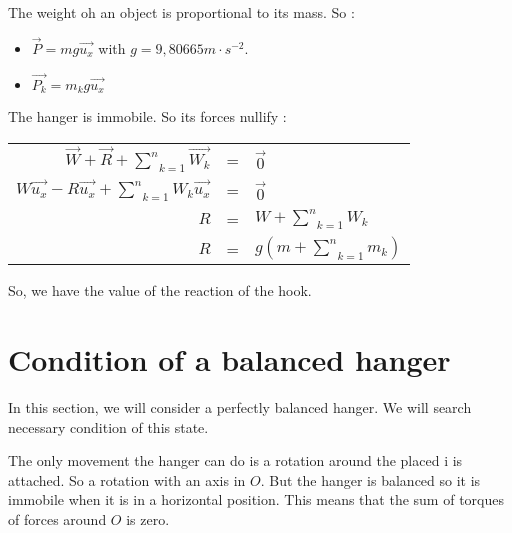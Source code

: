 \documentclass{report}
\begin{document}
The weight oh an object is proportional to its mass. So :
\begin{itemize}
\item $\overrightarrow{P} = m g \overrightarrow{u_x}$ with $g = 9,806 65 m \cdot s^{-2}$.
\item $\overrightarrow{P_k} = m_k g \overrightarrow{u_x}$
\end{itemize}

The hanger is immobile. So its forces nullify :

\begin{tabular}{rcl}
   $\overrightarrow{W} + \overrightarrow{R} +  \underset{k = 1}{\overset{n}{\sum}} \overrightarrow{W_k}$ & = & $\overrightarrow{0}$\\
   $ W \overrightarrow{u_x} - R \overrightarrow{u_x} + \underset{k = 1}{\overset{n}{\sum}} W_k \overrightarrow{u_x}$ & = & $\overrightarrow{0}$\\
   $R$ & = & $W + \underset{k = 1}{\overset{n}{\sum}} W_k$ \\
   $R$ & = & $g  (m + \underset{k = 1}{\overset{n}{\sum}} m_k)$ \\
\end{tabular}

So, we have the value of the reaction of the hook.

\section{Condition of a balanced hanger}

In this section, we will consider a perfectly balanced hanger.
We will search necessary condition of this state.

The only movement the hanger can do is a rotation around the placed i is attached. So a rotation with an axis in $O$.
But the hanger is balanced so it is immobile when it is in a horizontal position.
This means that the sum of torques of forces around $O$ is zero.
\end{document}
